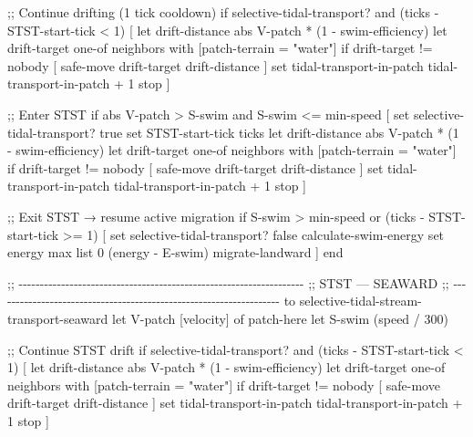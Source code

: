 \documentclass[
]{book}
\newenvironment{Shaded}{\begin{snugshade}}{\end{snugshade}}
\newcommand{\NormalTok}[1]{#1}
\begin{document}
\begin{Shaded}
\begin{Highlighting}[]
\NormalTok{  ;; Continue drifting (1 tick cooldown)}
\NormalTok{  if selective{-}tidal{-}transport? and (ticks {-} STST{-}start{-}tick \textless{} 1) [}
\NormalTok{    let drift{-}distance abs V{-}patch * (1 {-} swim{-}efficiency)}
\NormalTok{    let drift{-}target one{-}of neighbors with [patch{-}terrain = "water"]}
\NormalTok{    if drift{-}target != nobody [ safe{-}move drift{-}target drift{-}distance ]}
\NormalTok{    set tidal{-}transport{-}in{-}patch tidal{-}transport{-}in{-}patch + 1}
\NormalTok{    stop}
\NormalTok{  ]}

\NormalTok{  ;; Enter STST}
\NormalTok{  if abs V{-}patch \textgreater{} S{-}swim and S{-}swim \textless{}= min{-}speed [}
\NormalTok{    set selective{-}tidal{-}transport? true}
\NormalTok{    set STST{-}start{-}tick ticks}
\NormalTok{    let drift{-}distance abs V{-}patch * (1 {-} swim{-}efficiency)}
\NormalTok{    let drift{-}target one{-}of neighbors with [patch{-}terrain = "water"]}
\NormalTok{    if drift{-}target != nobody [ safe{-}move drift{-}target drift{-}distance ]}
\NormalTok{    set tidal{-}transport{-}in{-}patch tidal{-}transport{-}in{-}patch + 1}
\NormalTok{    stop}
\NormalTok{  ]}

\NormalTok{  ;; Exit STST → resume active migration}
\NormalTok{  if S{-}swim \textgreater{} min{-}speed or (ticks {-} STST{-}start{-}tick \textgreater{}= 1) [}
\NormalTok{    set selective{-}tidal{-}transport? false}
\NormalTok{    calculate{-}swim{-}energy}
\NormalTok{    set energy max list 0 (energy {-} E{-}swim)}
\NormalTok{    migrate{-}landward}
\NormalTok{  ]}
\NormalTok{end}

\NormalTok{;; {-}{-}{-}{-}{-}{-}{-}{-}{-}{-}{-}{-}{-}{-}{-}{-}{-}{-}{-}{-}{-}{-}{-}{-}{-}{-}{-}{-}{-}{-}{-}{-}{-}{-}{-}{-}{-}{-}{-}{-}{-}{-}{-}{-}{-}{-}{-}{-}{-}{-}{-}{-}{-}{-}{-}{-}{-}{-}{-}{-}{-}{-}{-}{-}{-}{-}{-}}
\NormalTok{;;  STST — SEAWARD}
\NormalTok{;; {-}{-}{-}{-}{-}{-}{-}{-}{-}{-}{-}{-}{-}{-}{-}{-}{-}{-}{-}{-}{-}{-}{-}{-}{-}{-}{-}{-}{-}{-}{-}{-}{-}{-}{-}{-}{-}{-}{-}{-}{-}{-}{-}{-}{-}{-}{-}{-}{-}{-}{-}{-}{-}{-}{-}{-}{-}{-}{-}{-}{-}{-}{-}{-}{-}{-}{-}}
\NormalTok{to selective{-}tidal{-}stream{-}transport{-}seaward}
\NormalTok{  let V{-}patch [velocity] of patch{-}here}
\NormalTok{  let S{-}swim (speed / 300)}

\NormalTok{  ;; Continue STST drift}
\NormalTok{  if selective{-}tidal{-}transport? and (ticks {-} STST{-}start{-}tick \textless{} 1) [}
\NormalTok{    let drift{-}distance abs V{-}patch * (1 {-} swim{-}efficiency)}
\NormalTok{    let drift{-}target one{-}of neighbors with [patch{-}terrain = "water"]}
\NormalTok{    if drift{-}target != nobody [ safe{-}move drift{-}target drift{-}distance ]}
\NormalTok{    set tidal{-}transport{-}in{-}patch tidal{-}transport{-}in{-}patch + 1}
\NormalTok{    stop}
\NormalTok{  ]}


\end{Highlighting}
\end{Shaded}
\end{document}
